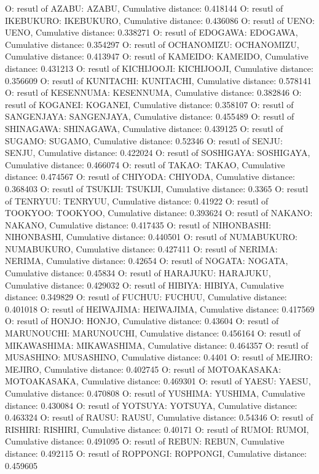 O: resutl of AZABU: AZABU, Cumulative distance: 0.418144
O: resutl of IKEBUKURO: IKEBUKURO, Cumulative distance: 0.436086
O: resutl of UENO: UENO, Cumulative distance: 0.338271
O: resutl of EDOGAWA: EDOGAWA, Cumulative distance: 0.354297
O: resutl of OCHANOMIZU: OCHANOMIZU, Cumulative distance: 0.413947
O: resutl of KAMEIDO: KAMEIDO, Cumulative distance: 0.431213
O: resutl of KICHIJOOJI: KICHIJOOJI, Cumulative distance: 0.356609
O: resutl of KUNITACHI: KUNITACHI, Cumulative distance: 0.578141
O: resutl of KESENNUMA: KESENNUMA, Cumulative distance: 0.382846
O: resutl of KOGANEI: KOGANEI, Cumulative distance: 0.358107
O: resutl of SANGENJAYA: SANGENJAYA, Cumulative distance: 0.455489
O: resutl of SHINAGAWA: SHINAGAWA, Cumulative distance: 0.439125
O: resutl of SUGAMO: SUGAMO, Cumulative distance: 0.52346
O: resutl of SENJU: SENJU, Cumulative distance: 0.422024
O: resutl of SOSHIGAYA: SOSHIGAYA, Cumulative distance: 0.466074
O: resutl of TAKAO: TAKAO, Cumulative distance: 0.474567
O: resutl of CHIYODA: CHIYODA, Cumulative distance: 0.368403
O: resutl of TSUKIJI: TSUKIJI, Cumulative distance: 0.3365
O: resutl of TENRYUU: TENRYUU, Cumulative distance: 0.41922
O: resutl of TOOKYOO: TOOKYOO, Cumulative distance: 0.393624
O: resutl of NAKANO: NAKANO, Cumulative distance: 0.417435
O: resutl of NIHONBASHI: NIHONBASHI, Cumulative distance: 0.440501
O: resutl of NUMABUKURO: NUMABUKURO, Cumulative distance: 0.427411
O: resutl of NERIMA: NERIMA, Cumulative distance: 0.42654
O: resutl of NOGATA: NOGATA, Cumulative distance: 0.45834
O: resutl of HARAJUKU: HARAJUKU, Cumulative distance: 0.429032
O: resutl of HIBIYA: HIBIYA, Cumulative distance: 0.349829
O: resutl of FUCHUU: FUCHUU, Cumulative distance: 0.401018
O: resutl of HEIWAJIMA: HEIWAJIMA, Cumulative distance: 0.417569
O: resutl of HONJO: HONJO, Cumulative distance: 0.43604
O: resutl of MARUNOUCHI: MARUNOUCHI, Cumulative distance: 0.456164
O: resutl of MIKAWASHIMA: MIKAWASHIMA, Cumulative distance: 0.464357
O: resutl of MUSASHINO: MUSASHINO, Cumulative distance: 0.4401
O: resutl of MEJIRO: MEJIRO, Cumulative distance: 0.402745
O: resutl of MOTOAKASAKA: MOTOAKASAKA, Cumulative distance: 0.469301
O: resutl of YAESU: YAESU, Cumulative distance: 0.470808
O: resutl of YUSHIMA: YUSHIMA, Cumulative distance: 0.430084
O: resutl of YOTSUYA: YOTSUYA, Cumulative distance: 0.463324
O: resutl of RAUSU: RAUSU, Cumulative distance: 0.54346
O: resutl of RISHIRI: RISHIRI, Cumulative distance: 0.40171
O: resutl of RUMOI: RUMOI, Cumulative distance: 0.491095
O: resutl of REBUN: REBUN, Cumulative distance: 0.492115
O: resutl of ROPPONGI: ROPPONGI, Cumulative distance: 0.459605
